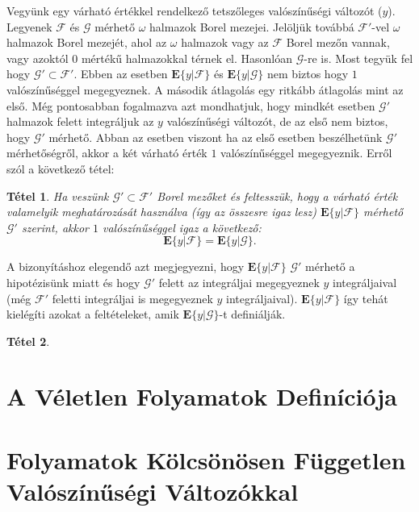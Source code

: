 \documentclass{article}
\newtheorem{theorem}{Tétel}
\begin{document}
Vegyünk egy várható értékkel rendelkező tetszőleges valószínűségi változót ($y$). Legyenek $\mathscr{F}$ és $\mathscr{G}$ mérhető $\omega$ halmazok Borel mezejei. Jelöljük továbbá $\mathscr{F}'$-vel $\omega$ halmazok Borel mezejét, ahol az $\omega$ halmazok vagy az $\mathscr{F}$ Borel mezőn vannak, vagy azoktól $0$ mértékű halmazokkal térnek el. Hasonlóan $\mathscr{G}$-re is. Most tegyük fel hogy $\mathscr{G}' \subset \mathscr{F}'$. Ebben az esetben $\mathrm{\textbf{E}}\{y | \mathscr{F}\}$ és $\mathrm{\textbf{E}}\{y | \mathscr{G}\}$ nem biztos hogy $1$ valószínűséggel megegyeznek. A második átlagolás egy ritkább átlagolás mint az első. Még pontosabban fogalmazva azt mondhatjuk, hogy mindkét esetben $\mathscr{G}'$ halmazok felett integráljuk az $y$ valószínűségi változót, de az első nem biztos, hogy $\mathscr{G}'$ mérhető. Abban az esetben viszont ha az első esetben beszélhetünk $\mathscr{G}'$ mérhetőségről, akkor a két várható érték $1$ valószínűséggel megegyeznik. Erről szól a következő tétel:
\begin{theorem}
	Ha veszünk $\mathscr{G}' \subset \mathscr{F}'$ Borel mezőket és feltesszük, hogy a várható érték valamelyik meghatározását használva (így az összesre igaz lesz) $\mathrm{\textbf{E}}\{y | \mathscr{F}\}$ mérhető $\mathscr{G}'$ szerint, akkor $1$ valószínűséggel igaz a következő:
\begin{equation}
	\mathrm{\textbf{E}}\{y | \mathscr{F}\} = \mathrm{\textbf{E}}\{y | \mathscr{G}\}.
\end{equation}
\end{theorem}
A bizonyításhoz elegendő azt megjegyezni, hogy $\mathrm{\textbf{E}}\{y | \mathscr{F}\}$ $\mathscr{G}'$ mérhető a hipotézisünk miatt és hogy $\mathscr{G}'$ felett az integráljai megegyeznek $y$ integráljaival (még $\mathscr{F}'$ feletti integráljai is megegyeznek $y$ integráljaival). $\mathrm{\textbf{E}}\{y | \mathscr{F}\}$ így tehát kielégíti azokat a feltételeket, amik $\mathrm{\textbf{E}}\{y | \mathscr{G}\}$-t definiálják. 
\begin{theorem}

\end{theorem}
\section{A Véletlen Folyamatok Definíciója}\label{sec:veletlenfolyamatokdefinicioja}
\section{Folyamatok Kölcsönösen Független Valószínűségi Változókkal}\label{sec:folyamatokkolcsonosenfuggetlenvaloszinusegivaltozokkal}
\end{document}
